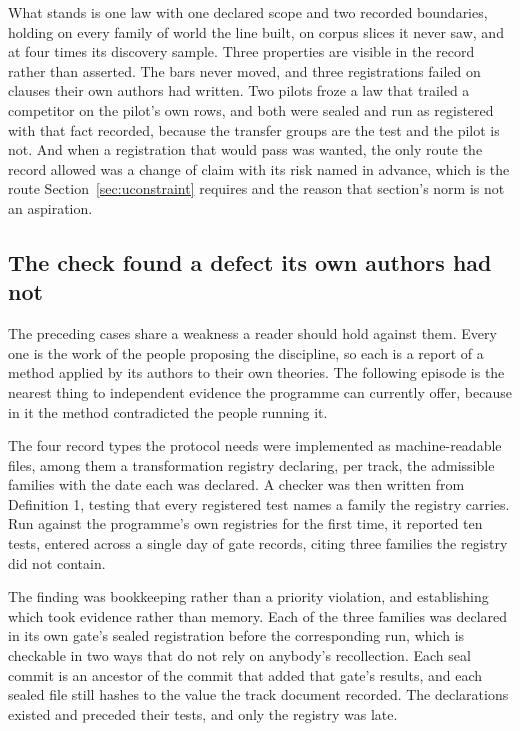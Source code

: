 \documentclass[11pt]{article}
\theoremstyle{remark}
\begin{document}
What stands is one law with one declared scope and two recorded boundaries, holding
on every family of world the line built, on corpus slices it never saw, and at four
times its discovery sample. Three properties are visible in the record rather than
asserted. The bars never moved, and three registrations failed on clauses their own
authors had written. Two pilots froze a law that trailed a competitor on the
pilot's own rows, and both were sealed and run as registered with that fact
recorded, because the transfer groups are the test and the pilot is not. And when a
registration that would pass was wanted, the only route the record allowed was a
change of claim with its risk named in advance, which is the route
Section~\ref{sec:uconstraint} requires and the reason that section's norm is not an
aspiration.

\subsection{The check found a defect its own authors had not}

The preceding cases share a weakness a reader should hold against them. Every one is
the work of the people proposing the discipline, so each is a report of a method
applied by its authors to their own theories. The following episode is the nearest
thing to independent evidence the programme can currently offer, because in it the
method contradicted the people running it.

The four record types the protocol needs were implemented as machine-readable files,
among them a transformation registry declaring, per track, the admissible families
with the date each was declared. A checker was then written from Definition 1,
testing that every registered test names a family the registry carries. Run against
the programme's own registries for the first time, it reported ten tests, entered
across a single day of gate records, citing three families the registry did not
contain.

The finding was bookkeeping rather than a priority violation, and establishing which
took evidence rather than memory. Each of the three families was declared in its own
gate's sealed registration before the corresponding run, which is checkable in two
ways that do not rely on anybody's recollection. Each seal commit is an ancestor of
the commit that added that gate's results, and each sealed file still hashes to the
value the track document recorded. The declarations existed and preceded their
tests, and only the registry was late.
\end{document}
